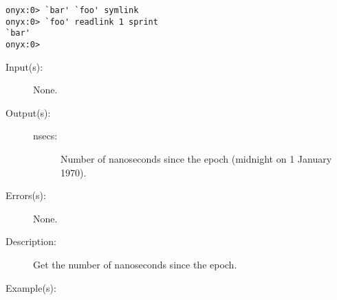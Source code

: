 \begin{description}
\begin{description}
\begin{verbatim}
onyx:0> `bar' `foo' symlink
onyx:0> `foo' readlink 1 sprint
`bar'
onyx:0>
		\end{verbatim}
	\end{description}
\label{systemdict:realtime}
\item[{\onyxop{--}{realtime}{nsecs}}: ]
	\begin{description}\item[]
	\item[Input(s): ] None.
	\item[Output(s): ]
		\begin{description}\item[]
		\item[nsecs: ]
			Number of nanoseconds since the epoch (midnight on 1
			January 1970).
		\end{description}
	\item[Errors(s): ] None.
	\item[Description: ]
		Get the number of nanoseconds since the epoch.
	\item[Example(s): ]\begin{verbatim}


\end{verbatim}
\end{description}
\end{description}
